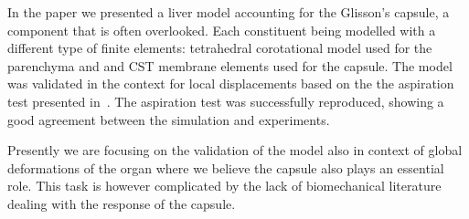 \documentclass{acm_proc_article-sp}
\begin{document}
In the paper we presented a liver model accounting for the Glisson's capsule, a component that is often overlooked. Each constituent being modelled with a different type 
of finite elements: tetrahedral corotational model used for the parenchyma and
and CST membrane elements used for the capsule. 
The model was validated in the context for local displacements based on the the aspiration test presented in~\cite{Hollenstein2006}. The aspiration test
was successfully reproduced, showing a good agreement between the simulation and experiments. 

Presently we are focusing on the validation of the model also in context of
global deformations of the organ where we believe the capsule also plays an
essential role. This task is however complicated by the lack of biomechanical
literature dealing with the response of the capsule.




%
%



\end{document}
